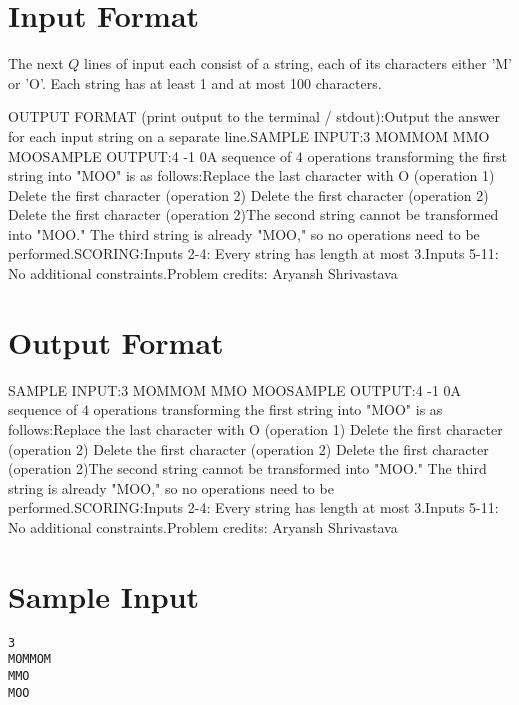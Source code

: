 \documentclass[12pt]{article}
\begin{document}
\section*{Input Format}
The next $Q$ lines of input each consist of a string, each of its characters
either 'M' or 'O'. Each string has at least 1 and at most 100 characters.

OUTPUT FORMAT (print output to the terminal / stdout):Output the answer for each input string on a separate line.SAMPLE INPUT:3
MOMMOM
MMO
MOOSAMPLE OUTPUT:4
-1
0A sequence of $4$ operations transforming the first string into "MOO" is as
follows:Replace the last character with O (operation 1)
Delete the first character (operation 2)
Delete the first character (operation 2)
Delete the first character (operation 2)The second string cannot be transformed into "MOO." The third string is already
"MOO," so no operations need to be performed.SCORING:Inputs 2-4: Every string has length at most $3$.Inputs 5-11: No additional constraints.Problem credits: Aryansh Shrivastava

\section*{Output Format}
SAMPLE INPUT:3
MOMMOM
MMO
MOOSAMPLE OUTPUT:4
-1
0A sequence of $4$ operations transforming the first string into "MOO" is as
follows:Replace the last character with O (operation 1)
Delete the first character (operation 2)
Delete the first character (operation 2)
Delete the first character (operation 2)The second string cannot be transformed into "MOO." The third string is already
"MOO," so no operations need to be performed.SCORING:Inputs 2-4: Every string has length at most $3$.Inputs 5-11: No additional constraints.Problem credits: Aryansh Shrivastava

\section*{Sample Input}
\begin{verbatim}
3
MOMMOM
MMO
MOO
\end{verbatim}
\end{document}
